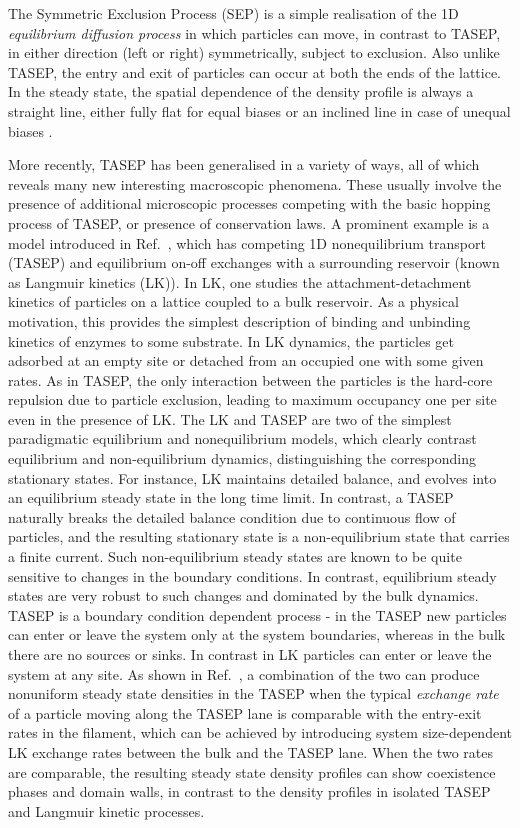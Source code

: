\documentclass[aps,pre,twocolumn,superscriptaddress,amsmath,amssymb,longbibliography,floatfix]{revtex4}
\begin{document}
The Symmetric Exclusion Process (SEP) is a simple realisation
of the 1D {\em equilibrium diffusion process} in which particles can move,
in contrast to TASEP, in either direction (left or right) symmetrically, subject to exclusion. Also unlike TASEP,
the entry and exit of particles can occur at both the ends of the lattice. In the steady state,
the spatial dependence of the density profile is always a straight line, either fully flat for
equal biases or an inclined line in case of unequal biases \cite{sep}.

More recently,  TASEP has been generalised in a variety of ways, all of which 
reveals many new interesting macroscopic phenomena. These usually involve the presence of additional  microscopic processes competing with the basic hopping process of TASEP, or presence of conservation laws. A prominent example is a model introduced in Ref.~\cite{frey-lktasep}, which has competing 1D nonequilibrium transport (TASEP)
and equilibrium on-off exchanges with a surrounding reservoir (known as Langmuir kinetics (LK)).
   In LK, one studies the attachment-detachment
kinetics of particles on a lattice coupled to a bulk reservoir. As a physical motivation, this provides the simplest description of binding and unbinding kinetics of enzymes to some substrate. In LK dynamics, the particles get adsorbed
at an empty site or detached from an occupied one with some given rates. As in TASEP,
the only interaction between the particles is the hard-core repulsion due to particle exclusion, leading to maximum occupancy one per site even in the presence of LK.
The LK and TASEP are two of the simplest paradigmatic equilibrium and nonequilibrium models, which clearly contrast
equilibrium and non-equilibrium dynamics, distinguishing the corresponding stationary states. For instance, LK maintains detailed balance, and evolves
into an equilibrium steady state in the long time limit. In contrast, a TASEP naturally breaks the detailed balance condition due to continuous flow of particles, and the resulting  stationary state is a
non-equilibrium state that carries a finite current. Such non-equilibrium steady
states are known to be quite sensitive to changes in the boundary conditions. In contrast, equilibrium steady
states are very robust to such changes and dominated by the bulk dynamics. TASEP is a boundary condition dependent process - in the TASEP
new particles can enter or leave the system only at the system boundaries, whereas
in the bulk there are no sources or sinks. In contrast in LK particles
can enter or leave the system at any site. As shown in Ref.~\cite{frey-lktasep}, a combination of the two can produce nonuniform steady state
densities in the TASEP when the typical    {\em exchange
rate} of a particle moving along the TASEP lane is comparable with the entry-exit rates in
the filament, which can be achieved by introducing  system size-dependent LK exchange rates between the bulk and the TASEP lane. When the two rates are comparable, the resulting steady
state density profiles can show coexistence phases and domain walls, in contrast to the 
density profiles in isolated TASEP and Langmuir kinetic processes.
\end{document}
